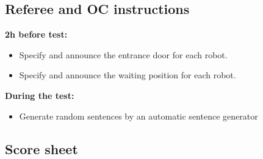 \subsection{Referee and OC instructions}
\textbf{2h before test:}
\begin{itemize}
\item Specify and announce the entrance door for each robot. 
\item Specify and announce the waiting position for each robot. 
\end{itemize}
\textbf{During the test:}
\begin{itemize}
\item Generate random sentences by an automatic sentence generator
\end{itemize}

\newpage
\subsection{Score sheet}


 
